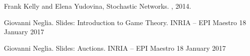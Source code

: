 \begin{thebibliography}{alpha}
	
	 Frank Kelly and Elena Yudovina,
	\newblock Stochastic Networks.
	, 2014.
	
	 Giovanni Neglia.
	\newblock Slides: Introduction to Game Theory.
    \newblock  INRIA – EPI Maestro 18 January 2017
    
     Giovanni Neglia.
	\newblock Slides: Auctions.
    \newblock INRIA – EPI Maestro 18 January 2017
	
\end{thebibliography}